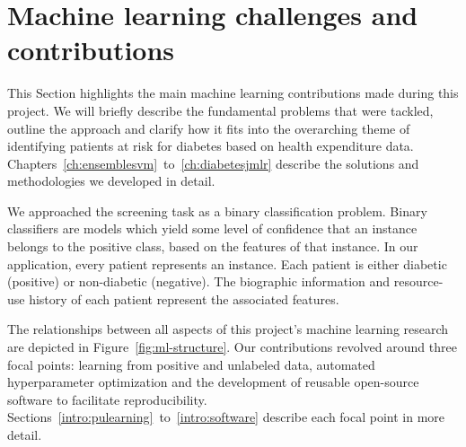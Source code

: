 \section{Machine learning challenges and contributions} \label{intro:machine-learning}
This Section highlights the main machine learning contributions made during this project. We will briefly describe the fundamental problems that were tackled, outline the approach and clarify how it fits into the overarching theme of identifying patients at risk for diabetes based on health expenditure data. Chapters~\ref{ch:ensemblesvm}~to~\ref{ch:diabetesjmlr} describe the solutions and methodologies we developed in detail.

We approached the screening task as a binary classification problem. Binary classifiers are models which yield some level of confidence that an instance belongs to the positive class, based on the features of that instance. In our application, every patient represents an instance. Each patient is either diabetic (positive) or non-diabetic (negative). The biographic information and resource-use history of each patient represent the associated features.

The relationships between all aspects of this project's machine learning research are depicted in Figure~\ref{fig:ml-structure}. Our contributions revolved around three focal points: learning from positive and unlabeled data, automated hyperparameter optimization and the development of reusable open-source software to facilitate reproducibility. Sections~\ref{intro:pulearning}~to~\ref{intro:software} describe each focal point in more detail.


